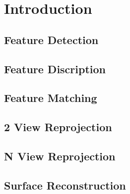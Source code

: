 
\chapter{Introduction}

\section{Feature Detection}

\section{Feature Discription}

\section{Feature Matching}

\section{2 View Reprojection}

\section{N View Reprojection}

\section{Surface Reconstruction}

